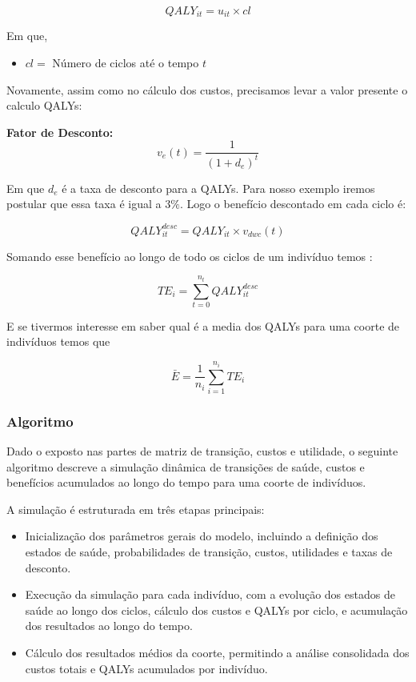 \documentclass[12pt]{article}
\theoremstyle{break}
\begin{document}
    \[
    QALY_{it} = u_{it} \times cl
    \]


Em que,

\begin{itemize}
    \item $cl =$ Número de ciclos até o tempo $t$
\end{itemize}


Novamente, assim como no cálculo dos custos, precisamos levar a valor presente o calculo QALYs: 

 \textbf{Fator de Desconto:}
    \[
    v_{e}(t) = \frac{1}{(1 + d_e)^t}
    \]


Em que  $d_e$ é a taxa de desconto para a QALYs. Para nosso exemplo iremos postular que essa taxa é igual a $3\%$. Logo o benefício descontado em cada ciclo é:

    \[
    QALY_{it}^{desc} = QALY_{it} \times v_{dwc}(t)
    \]


Somando esse benefício ao longo de todo os ciclos de um indivíduo temos :

    \[
    TE_i = \sum_{t=0}^{n_t} QALY_{it}^{desc}
    \]


E se tivermos interesse em saber qual é a media dos QALYs para uma coorte de indivíduos temos que 


    \[
    \bar{E} = \frac{1}{n_i} \sum_{i=1}^{n_i} TE_i
    \]


\subsubsection{Algoritmo}

Dado o exposto nas partes de matriz de transição, custos e utilidade, o seguinte algoritmo descreve a simulação dinâmica de transições de saúde, custos e benefícios acumulados ao longo do tempo para uma coorte de indivíduos. 

A simulação é estruturada em três etapas principais:


\begin{itemize}
    \item Inicialização dos parâmetros gerais do modelo, incluindo a definição dos estados de saúde, probabilidades de transição, custos, utilidades e taxas de desconto.


    \item Execução da simulação para cada indivíduo, com a evolução dos estados de saúde ao longo dos ciclos, cálculo dos custos e QALYs por ciclo, e acumulação dos resultados ao longo do tempo.


    \item Cálculo dos resultados médios da coorte, permitindo a análise consolidada dos custos totais e QALYs acumulados por indivíduo.
\end{itemize}
\end{document}
